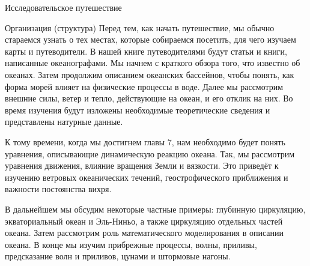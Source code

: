 \begin{chapter}{Исследовательское путешествие}
\begin{section}{Организация (структура)}
Перед тем, как начать путешествие, мы обычно стараемся узнать о тех местах, 
которые собираемся посетить, для чего изучаем карты и путеводители. 
В нашей книге путеводителями будут статьи и книги, написанные океанографами. 
Мы начнем с краткого обзора того, что известно об океанах. 
Затем продолжим описанием океанских бассейнов, чтобы понять, как форма 
морей влияет на физические процессы в воде. Далее мы рассмотрим внешние силы, 
ветер и тепло, действующие на океан, и его отклик на них. Во время изучения 
будут изложены необходимые теоретические сведения и представлены натурные 
данные.
%


К тому времени, когда мы достигнем главы 7, нам необходимо будет понять 
уравнения, описывающие динамическую реакцию океана. Так, мы рассмотрим 
уравнения движения, влияние вращения Земли и вязкости. Это приведёт к 
изучению ветровых океанических течений, геострофического приближения и важности 
постоянства вихря.
%

В дальнейшем мы обсудим некоторые частные примеры: глубинную циркуляцию, 
экваториальный океан и Эль-Ниньо, а также циркуляцию отдельных частей океана. 
Затем рассмотрим роль математического моделирования в описании океана. 
В конце мы изучим прибрежные процессы, волны, приливы, предсказание волн 
и приливов, цунами и штормовые нагоны.
%
\end{section}


\end{chapter}
